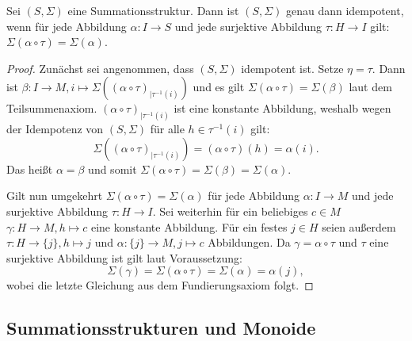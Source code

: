 \documentclass{article}
\begin{document}
\begin{theorem}
  Sei $(S, \Sigma)$ eine Summationsstruktur. Dann ist $(S, \Sigma)$ genau dann idempotent, 
  wenn für jede Abbildung $\alpha \colon I \to S$ und jede surjektive Abbildung $\tau \colon H \to I$ gilt:
  $\Sigma(\alpha \circ \tau) = \Sigma(\alpha)$.
\end{theorem}
\begin{proof}
  Zunächst sei angenommen, dass $(S, \Sigma)$ idempotent ist.
  Setze $\eta = \tau$. Dann ist $\beta \colon I \to M, i \mapsto \Sigma((\alpha \circ \tau)_{\mid \tau^{-1}(i)})$
  und es gilt $\Sigma(\alpha \circ \tau) = \Sigma(\beta)$ laut dem Teilsummenaxiom.
  $(\alpha \circ \tau)_{\mid \tau^{-1}(i)}$ ist eine konstante Abbildung,
  weshalb wegen der Idempotenz von $(S, \Sigma)$ für alle $h \in \tau^{-1}(i)$ gilt: 
  \begin{equation*}
    \Sigma((\alpha \circ \tau)_{\mid \tau^{-1}(i)}) = (\alpha \circ \tau)(h) = \alpha(i).
  \end{equation*}
  Das heißt $\alpha = \beta$ und somit $\Sigma(\alpha \circ \tau) = \Sigma(\beta) = \Sigma(\alpha)$.

  Gilt nun umgekehrt $\Sigma(\alpha \circ \tau) = \Sigma(\alpha)$ für jede Abbildung $\alpha \colon I \to M$ und jede surjektive Abbildung $\tau \colon H \to I$.
  Sei weiterhin für ein beliebiges $c \in M$ $\gamma \colon H \to M, h \mapsto c$ eine konstante Abbildung.
  Für ein festes $j \in H$ seien außerdem $\tau \colon H \to \{j\}, h \mapsto j$ und $\alpha \colon \{j\} \to M, j \mapsto c$ Abbildungen.
  Da $\gamma = \alpha \circ \tau$ und $\tau$ eine surjektive Abbildung ist gilt laut Voraussetzung:
  \begin{equation*}
    \Sigma(\gamma) = \Sigma(\alpha \circ \tau) = \Sigma(\alpha) = \alpha(j),
  \end{equation*}
  wobei die letzte Gleichung aus dem Fundierungsaxiom folgt.
\end{proof}

\subsection{Summationsstrukturen und Monoide}
\end{document}
